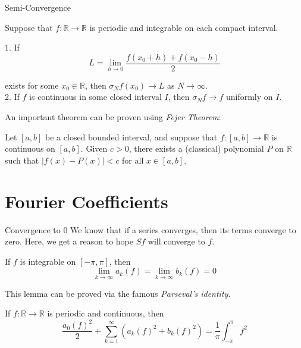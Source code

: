 \documentclass{beamer}
\begin{document}
\begin{frame}{Semi-Convergence}
\small
\begin{theorem}[Fejer]
    Suppose that $f: \mathbb{R} \to \mathbb{R}$ is periodic and integrable on each compact interval.

        1. If \begin{equation*}
             L = \lim_{h \to 0} \frac{f(x_0 + h) + f(x_0 - h)}{2}
        \end{equation*}

        exists for some $x_0 \in \mathbb{R}$, then $\sigma_Nf(x_0) \to L$ as $N \to \infty$.   \\
        2. If \(f\) is continuous in some closed interval $I$, then $\sigma_Nf \to f$ uniformly on $I$.

\end{theorem}

An important theorem can be proven using \textit{Fejer Theorem}:
\begin{theorem}
Let $[a, b]$ be a closed bounded interval, and suppose that $f : [a, b] \rightarrow \mathbb{R}$ is continuous on $[a, b]$. Given $c > 0$, there exists a (classical) polynomial $P$ on $\mathbb{R}$ such that $|f(x) - P(x)| < c$ for all $x \in [a, b]$.

\end{theorem}
\end{frame}



\section{Fourier Coefficients}


\begin{frame}{Convergence to 0}
    \small
    We know that if a series converges, then its terms converge to zero. Here, we get a reason to hope $Sf$ will converge to $f$.
    \begin{theorem}
        If $f$ is integrable on $[-\pi,\pi]$, then
        \[
        \lim_{k \to \infty}a_k(f)  = \lim_{k \to \infty}b_k(f) = 0
        \]
    \end{theorem}
    This lemma can be proved via the famous \textit{Parseval's identity}.
    \begin{theorem}
        If $f: \mathbb{R} \to \mathbb{R}$ is periodic and continuous, then
        \[
        \frac{a_0(f)^2}{2} + \sum_{k = 1}^{\infty}(a_k(f)^2 + b_k(f)^2) = \frac{1}{\pi}\int_{-\pi}^{\pi}f^2
        \]
    \end{theorem}

\end{frame}
\end{document}

